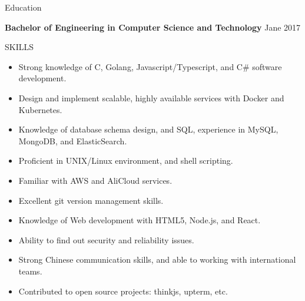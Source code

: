 \documentclass{resume} %
\begin{document}

\begin{rSection}{Education}

  {\bf Bachelor of Engineering in Computer Science and Technology} \hfill {Jane 2017}

\end{rSection}

\begin{rSection}{SKILLS}
  \begin{itemize}
    \itemsep -3pt {}
    \item Strong knowledge of C, Golang, Javascript/Typescript, and C\# software development.
    \item Design and implement scalable, highly available services with Docker and Kubernetes.
    \item Knowledge of database schema design, and SQL, experience in MySQL, MongoDB, and ElasticSearch.
    \item Proficient in UNIX/Linux environment, and shell scripting.
    \item Familiar with AWS and AliCloud services.
    \item Excellent git version management skills.
    \item Knowledge of Web development with HTML5, Node.js, and React.
    \item Ability to find out security and reliability issues.
    \item Strong Chinese communication skills, and able to working with international teams.
    \item Contributed to open source projects: thinkjs, upterm, etc.
  \end{itemize}
\end{rSection}
\end{document}
